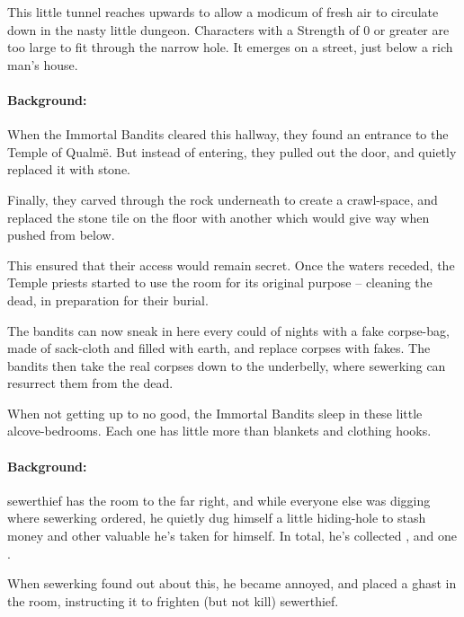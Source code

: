 \begin{multicols}{2}
\begin{boxtext}
\end{boxtext}

\label{pigShaft}

This little tunnel reaches upwards to allow a modicum of fresh air to circulate down in the nasty little dungeon.  Characters with a Strength of 0 or greater are too large to fit through the narrow hole.  It emerges on a street, just below a rich man's house.

\label{pigTemple}

\paragraph{Background:}
When the Immortal Bandits cleared this hallway, they found an entrance to the Temple of Qualm\"e.
But instead of entering, they pulled out the door, and quietly replaced it with stone.

Finally, they carved through the rock underneath to create a crawl-space, and replaced the stone tile on the floor with another which would give way when pushed from below.

This ensured that their access would remain secret.
Once the waters receded, the Temple priests started to use the room for its original purpose -- cleaning the dead, in preparation for their burial.

The bandits can now sneak in here every could of nights with a fake corpse-bag, made of sack-cloth and filled with earth, and replace corpses with fakes.
The bandits then take the real corpses down to the underbelly, where \gls{sewerking} can resurrect them from the dead.

\label{pigDogs}

When not getting up to no good, the Immortal Bandits sleep in these little alcove-bedrooms.
Each one has little more than blankets and clothing hooks.

\paragraph{Background:}
\Gls{sewerthief} has the room to the far right, and while everyone else was digging where \gls{sewerking} ordered, he quietly dug himself a little hiding-hole to stash money and other valuable he's taken for himself.
In total, he's collected \lootMedium, and one \lootMagic.

When \gls{sewerking} found out about this, he became annoyed, and placed a ghast in the room, instructing it to frighten (but not kill) \gls{sewerthief}.


\end{multicols}
